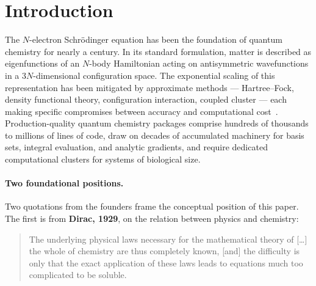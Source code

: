 \documentclass[11pt]{article}
\begin{document}
\begin{abstract}
As a structural by-product, stability of matter for $N$ non-overlapping atoms with kernel charge $Z$ follows from the Hardy inequality applied to the global $\Psi$ in a one-paragraph derivation, giving $E \ge -C N Z^3$ --- strikingly more compact than the standard Dyson--Lenard--Lieb--Thirring proof. We position RealQM as a parameter-free, real-space alternative to basis-set and density-functional methods for systems dominated by electrostatic (non-dispersive) bonding, and discuss its limitations and the open analytical questions raised by the free-boundary formulation.

\medskip
\noindent \textbf{Keywords:} quantum chemistry; multiphase wave functions; free-boundary problems; Bernoulli condition; real-space methods; stability of matter; protein folding; WebGPU; AI-assisted scientific software.
\end{abstract}

\section{Introduction}

The $N$-electron Schr\"odinger equation has been the foundation of quantum chemistry for nearly a century. In its standard formulation, matter is described as eigenfunctions of an $N$-body Hamiltonian acting on antisymmetric wavefunctions in a $3N$-dimensional configuration space. The exponential scaling of this representation has been mitigated by approximate methods --- Hartree--Fock, density functional theory, configuration interaction, coupled cluster --- each making specific compromises between accuracy and computational cost~\cite{HK64,KS65,MHG17}. Production-quality quantum chemistry packages comprise hundreds of thousands to millions of lines of code, draw on decades of accumulated machinery for basis sets, integral evaluation, and analytic gradients, and require dedicated computational clusters for systems of biological size.

\paragraph{Two foundational positions.}
Two quotations from the founders frame the conceptual position of this paper. The first is from \textbf{Dirac, 1929}, on the relation between physics and chemistry:

\begin{quote}
The underlying physical laws necessary for the mathematical theory of [\ldots] the whole of chemistry are thus completely known, [and] the difficulty is only that the exact application of these laws leads to equations much too complicated to be soluble.
\end{quote}
\end{document}
